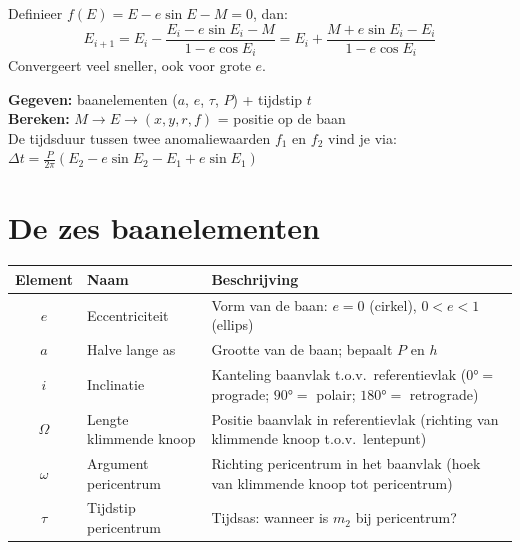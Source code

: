 \documentclass[11pt, a4paper]{article}
\begin{document}
\begin{tip}
Definieer $f(E) = E - e\sin E - M = 0$, dan:
\[
  E_{i+1} = E_i - \frac{E_i - e\sin E_i - M}{1 - e\cos E_i}
  = E_i + \frac{M + e\sin E_i - E_i}{1 - e\cos E_i}
\]
Convergeert veel sneller, ook voor grote $e$.
\end{tip}

\begin{weetje}
\textbf{Gegeven:} baanelementen ($a$, $e$, $\tau$, $P$) + tijdstip $t$ \\
\textbf{Bereken:} $M \to E \to (x, y, r, f)$ = positie op de baan \\
De tijdsduur tussen twee anomaliewaarden $f_1$ en $f_2$ vind je via:
$\Delta t = \frac{P}{2\pi}(E_2 - e\sin E_2 - E_1 + e\sin E_1)$
\end{weetje}

\section{De zes baanelementen}

\begin{center}
\renewcommand{\arraystretch}{1.5}
\begin{tabular}{cp{5cm}p{7cm}}
\toprule
\textbf{Element} & \textbf{Naam} & \textbf{Beschrijving} \\
\midrule
$e$ & Eccentriciteit & Vorm van de baan: $e=0$ (cirkel), $0<e<1$ (ellips) \\
$a$ & Halve lange as & Grootte van de baan; bepaalt $P$ en $h$ \\
$i$ & Inclinatie & Kanteling baanvlak t.o.v.\ referentievlak ($0°=$ prograde; $90°=$ polair; $180°=$ retrograde) \\
$\Omega$ & Lengte klimmende knoop & Positie baanvlak in referentievlak (richting van klimmende knoop t.o.v.\ lentepunt) \\
$\omega$ & Argument pericentrum & Richting pericentrum in het baanvlak (hoek van klimmende knoop tot pericentrum) \\
$\tau$ & Tijdstip pericentrum & Tijdsas: wanneer is $m_2$ bij pericentrum? \\
\bottomrule
\end{tabular}
\end{center}
\end{document}
